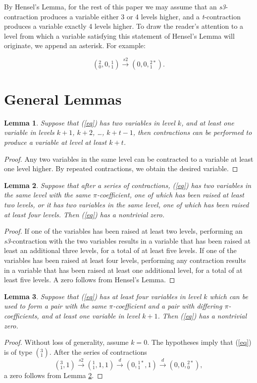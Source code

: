 \documentclass[12pt]{amsart}
\newtheorem{lemma}{Lemma}
\begin{document}
By Hensel's Lemma, for the rest of this paper we may assume that an \textit{s3}-contraction produces a variable either 3 or 4 levels higher, and a \textit{t}-contraction produces a variable exactly 4 levels higher.  To draw the reader's attention to a level from which a variable satisfying this statement of Hensel's Lemma will originate, we append an asterisk.  For example:

$$({}^{2}_{0}, 0, {}^{1}_{1}) \xrightarrow{s2} (0, 0, {}^{2*}_{1}).$$

\section{General Lemmas}

\begin{lemma} \label{slide}
Suppose that (\ref{eq}) has two variables in level $k$, and at least one variable in levels $k+1$, $k+2$, \ldots, $k+t-1$, then contractions can be performed to produce a variable at level at least $k+t$.
\end{lemma}
\begin{proof}
Any two variables in the same level can be contracted to a variable at least one level higher.  By repeated contractions, we obtain the desired variable.
\end{proof}

\begin{lemma}\label{fromtwo}
Suppose that after a series of contractions, (\ref{eq}) has two variables in the same level with the same $\pi$-coefficient, one of which has been raised at least two levels, or it has two variables in the same level, one of which has been raised at least four levels.  Then (\ref{eq}) has a nontrivial zero.
\end{lemma}
\begin{proof}
If one of the variables has been raised at least two levels, performing an \textit{s3}-contraction with the two variables results in a variable that has been raised at least an additional three levels, for a total of at least five levels.  If one of the variables has been raised at least four levels, performing any contraction results in a variable that has been raised at least one additional level, for a total of at least five levels.  A zero follows from Hensel's Lemma.
\end{proof}

\begin{lemma}\label{empty1}
Suppose that (\ref{eq}) has at least four variables in level $k$ which can be used to form a pair with the same $\pi$-coefficient and a pair with differing $\pi$-coefficients, and at least one variable in level $k+1$.  Then (\ref{eq}) has a nontrivial zero.
\end{lemma}
\begin{proof}
Without loss of generality, assume $k=0$.  The hypotheses imply that (\ref{eq}) is of type $({}^{3}_{1})$.  After the series of contractions
$$({}^{3}_{1}, 1) \xrightarrow{s2} ({}^{1}_{1}, 1, 1) \xrightarrow{d} (0, {}^{1*}_{1}, 1) \xrightarrow{d} (0, 0, {}^{2*}_{0}),$$
a zero follows from Lemma \ref{fromtwo}.
\end{proof}
\end{document}
